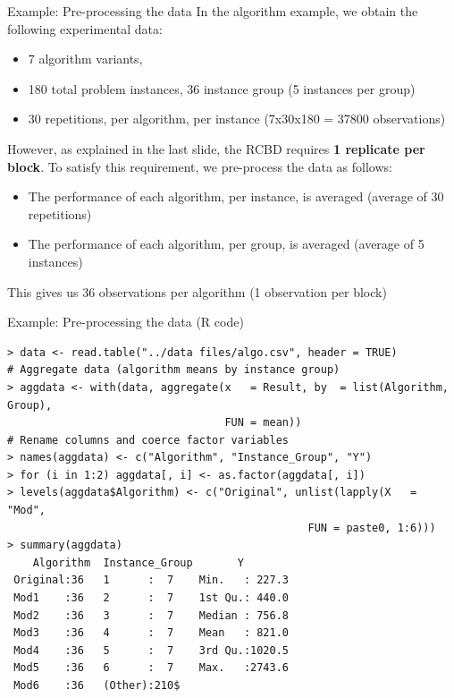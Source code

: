\begin{frame}{Example: Pre-processing the data}
  In the algorithm example, we obtain the following experimental data:
  \begin{itemize}
    \item 7 algorithm variants,
    \item 180 total problem instances, 36 instance group (5 instances per group)
    \item 30 repetitions, per algorithm, per instance (7x30x180 = 37800 observations)
  \end{itemize}\bigskip

  However, as explained in the last slide, the RCBD requires {\bf 1 replicate per block}.
  To satisfy this requirement, we pre-process the data as follows:
  \begin{itemize}
    \item The performance of each algorithm, per instance, is averaged (average of 30 repetitions)
    \item The performance of each algorithm, per group, is averaged (average of 5 instances)
  \end{itemize}
  This gives us 36 observations per algorithm (1 observation per block)
\end{frame}

\begin{frame}[fragile]{Example: Pre-processing the data (R code)}

{\smaller
\begin{verbatim}
> data <- read.table("../data files/algo.csv", header = TRUE)
# Aggregate data (algorithm means by instance group)
> aggdata <- with(data, aggregate(x   = Result, by  = list(Algorithm, Group),
                                  FUN = mean))
# Rename columns and coerce factor variables
> names(aggdata) <- c("Algorithm", "Instance_Group", "Y")
> for (i in 1:2) aggdata[, i] <- as.factor(aggdata[, i])
> levels(aggdata$Algorithm) <- c("Original", unlist(lapply(X   = "Mod",
                                               FUN = paste0, 1:6)))
> summary(aggdata)
    Algorithm  Instance_Group       Y
 Original:36   1      :  7    Min.   : 227.3
 Mod1    :36   2      :  7    1st Qu.: 440.0
 Mod2    :36   3      :  7    Median : 756.8
 Mod3    :36   4      :  7    Mean   : 821.0
 Mod4    :36   5      :  7    3rd Qu.:1020.5
 Mod5    :36   6      :  7    Max.   :2743.6
 Mod6    :36   (Other):210$
\end{verbatim}}
\end{frame}

